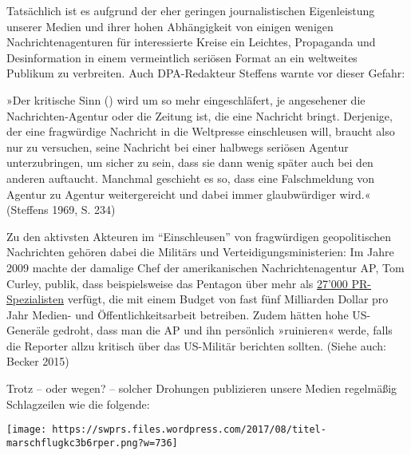Tatsächlich ist es aufgrund der eher geringen journalistischen
Eigenleistung unserer Medien und ihrer hohen Abhängigkeit von einigen
wenigen Nachrichtenagenturen für interessierte Kreise ein Leichtes,
Propaganda und Desinformation in einem vermeintlich seriösen Format an
ein weltweites Publikum zu verbreiten. Auch DPA-Redakteur Steffens
warnte vor dieser Gefahr:

»Der kritische Sinn () wird um so mehr eingeschläfert, je angesehener
die Nachrichten-Agentur oder die Zeitung ist, die eine Nachricht bringt.
Derjenige, der eine fragwürdige Nachricht in die Weltpresse einschleusen
will, braucht also nur zu versuchen, seine Nachricht bei einer halbwegs
seriösen Agentur unterzubringen, um sicher zu sein, dass sie dann wenig
später auch bei den anderen auftaucht. Manchmal geschieht es so, dass
eine Falschmeldung von Agentur zu Agentur weiter­gereicht und dabei
immer glaubwürdiger wird.« (Steffens 1969, S. 234)

Zu den aktivsten Akteuren im ``Einschleusen'' von fragwürdigen
geopolitischen Nachrichten gehören dabei die Militärs und
Verteidigungsministerien: Im Jahre 2009 machte der damalige Chef der
amerikanischen Nachrichtenagentur AP, Tom Curley, publik, dass
beispielsweise das Pentagon über mehr als
\href{http://www.tagesanzeiger.ch/ausland/amerika/27000-PRBerater-polieren-Image-der-USA/story/20404513}{27'000
PR-Spezialisten} verfügt, die mit einem Budget von fast fünf Milliarden
Dollar pro Jahr Medien- und Öffentlichkeitsarbeit betreiben. Zudem
hätten hohe US-Generäle gedroht, dass man die AP und ihn persönlich
»ruinieren« werde, falls die Reporter allzu kritisch über das US-Militär
berichten sollten. (Siehe auch: Becker 2015)

Trotz -- oder wegen? -- solcher Drohungen publizieren unsere Medien
regelmäßig Schlagzeilen wie die folgende:

\texttt{[image: https://swprs.files.wordpress.com/2017/08/titel-marschflugkc3b6rper.png?w=736]}

